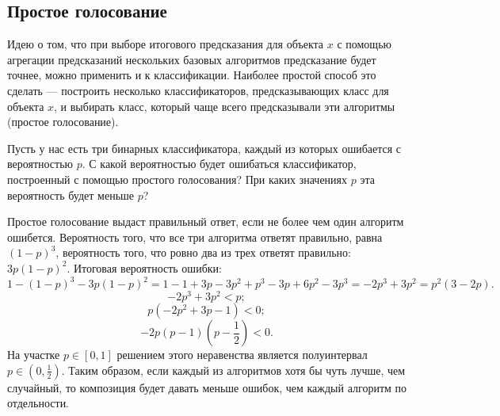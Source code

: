 \documentclass[12pt,fleqn]{article}
\begin{document}
    \subsection{Простое голосование}
    Идею о том, что при выборе итогового предсказания для объекта $x$ с помощью агрегации предсказаний нескольких базовых алгоритмов  предсказание будет точнее, можно применить и к классификации. Наиболее простой способ это сделать --- построить несколько классификаторов, предсказывающих класс для объекта $x$, и выбирать класс, который чаще всего предсказывали эти алгоритмы (простое голосование).
    \begin{vkProblem}
        Пусть у нас есть три бинарных классификатора, каждый из которых ошибается с вероятностью $p$. С какой вероятностью будет ошибаться классификатор, построенный с помощью простого голосования? При каких значениях $p$ эта вероятность будет меньше $p$?
    \end{vkProblem}    
    \begin{esSolution}
        Простое голосование выдаст правильный ответ, если не более чем один алгоритм ошибется. Вероятность того, что все три алгоритма ответят правильно, равна $(1-p)^3$, вероятность того, что ровно два из трех ответят правильно: $3p(1-p)^2$. Итоговая вероятность ошибки:
        \[
        1 - (1-p)^3 - 3p(1-p)^2 = 
        1 - 1 + 3p - 3p^2 + p^3 - 3p + 6 p^2 - 3 p^3 = 
         - 2 p^3+ 3  p^2 = p^2 (3 - 2p).
        \]
        \[
         - 2 p^3+ 3  p^2 < p;
        \]
        \[
        p(- 2 p^2+ 3 p - 1) < 0;
        \]
        \[
        -2 p (p-1) (p - \frac 1 2) < 0.
        \]
        На участке $p \in [0, 1]$ решением этого неравенства является полуинтервал $p \in (0, \frac 1 2)$. Таким образом, если каждый из алгоритмов хотя бы чуть лучше, чем случайный, то композиция будет давать меньше ошибок, чем каждый алгоритм по отдельности.
    \end{esSolution}
\end{document}
